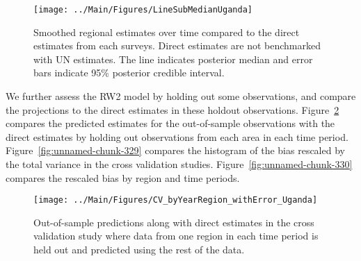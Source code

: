 \documentclass[12pt]{article}\usepackage[]{graphicx}\usepackage[]{color}
\newenvironment{knitrout}{}{} %
\begin{document}
\begin{knitrout}
\color{fgcolor}\begin{figure}[bht]

{\centering \texttt{[image: ../Main/Figures/LineSubMedianUganda]} 

}

\caption[Smoothed regional estimates over time compared to the direct estimates from each surveys]{Smoothed regional estimates over time compared to the direct estimates from each surveys. Direct estimates are not benchmarked with UN estimates. The line indicates posterior median and error bars indicate 95\% posterior credible interval.}\label{fig:unnamed-chunk-327}
\end{figure}


\end{knitrout}
We further assess the RW2 model by holding out some observations, and compare the projections to the direct estimates in these holdout observations. Figure~\ref{fig:unnamed-chunk-328} compares the predicted estimates for the out-of-sample observations  with the direct estimates by holding out observations from each area in each time period.  Figure~\ref{fig:unnamed-chunk-329} compares the histogram of the bias rescaled by the total variance in the cross validation studies. Figure~\ref{fig:unnamed-chunk-330} compares the rescaled bias by region and time periods.



 
\begin{knitrout}
\color{fgcolor}\begin{figure}[bht]

{\centering \texttt{[image: ../Main/Figures/CV\_byYearRegion\_withError\_Uganda]} 

}

\caption[Out-of-sample predictions along with direct estimates in the cross validation study where data from one region in each time period is held out and predicted using the rest of the data]{Out-of-sample predictions along with direct estimates in the cross validation study where data from one region in each time period is held out and predicted using the rest of the data.}\label{fig:unnamed-chunk-328}
\end{figure}


\end{knitrout}
\end{document}
